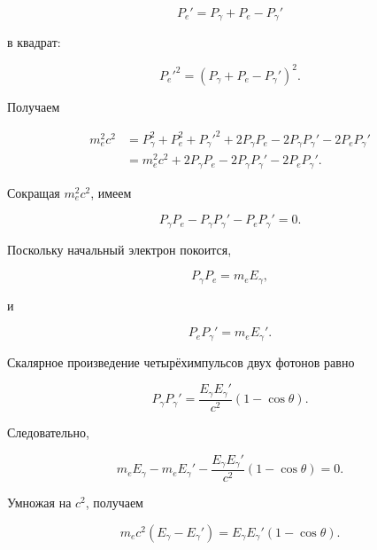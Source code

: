 \documentclass[../final.tex]{subfiles}
\begin{document}
\begin{equation*}
    P_e'
    =
    P_\gamma+P_e-P_\gamma'
\end{equation*}

в квадрат:

\begin{equation*}
    P_e'^2
    =
    \left(
        P_\gamma+P_e-P_\gamma'
    \right)^2.
\end{equation*}

Получаем

\begin{align*}
    m_e^2c^2
    &=
    P_\gamma^2
    +
    P_e^2
    +
    P_\gamma'^2
    +
    2P_\gamma P_e
    -
    2P_\gamma P_\gamma'
    -
    2P_eP_\gamma'
    \\[3pt]
    &=
    m_e^2c^2
    +
    2P_\gamma P_e
    -
    2P_\gamma P_\gamma'
    -
    2P_eP_\gamma'.
\end{align*}

Сокращая $m_e^2c^2$, имеем

\begin{equation*}
    P_\gamma P_e
    -
    P_\gamma P_\gamma'
    -
    P_eP_\gamma'
    =
    0.
\end{equation*}

Поскольку начальный электрон покоится,

\begin{equation*}
    P_\gamma P_e
    =
    m_eE_\gamma,
\end{equation*}

и

\begin{equation*}
    P_eP_\gamma'
    =
    m_eE_\gamma'.
\end{equation*}

Скалярное произведение четырёхимпульсов
двух фотонов равно

\begin{equation*}
    P_\gamma P_\gamma'
    =
    \frac{
        E_\gamma E_\gamma'
    }{
        c^2
    }
    (1-\cos\theta).
\end{equation*}

Следовательно,

\begin{equation*}
    m_eE_\gamma
    -
    m_eE_\gamma'
    -
    \frac{
        E_\gamma E_\gamma'
    }{
        c^2
    }
    (1-\cos\theta)
    =
    0.
\end{equation*}

Умножая на $c^2$, получаем

\begin{equation*}
    m_ec^2
    \left(
        E_\gamma-E_\gamma'
    \right)
    =
    E_\gamma E_\gamma'
    (1-\cos\theta).
\end{equation*}
\end{document}

